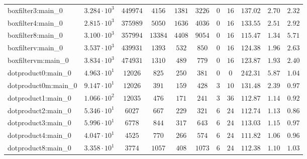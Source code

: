 \begin{tabular}{|l|c|c|c|c|c|c|c|c|c|c|}
boxfilter3:main\_0             & $ 3.284 \cdot 10^{3} $ & $ 449974   $ & $ 4156   $ & $ 1381   $ & $ 3226   $ & $ 0    $ & $ 16   $ & $ 137.02      $ & $ 2.70    $ & $ 2.32    $ \\
boxfilter4:main\_0             & $ 2.815 \cdot 10^{3} $ & $ 375989   $ & $ 5050   $ & $ 1636   $ & $ 4036   $ & $ 0    $ & $ 16   $ & $ 133.55      $ & $ 2.51    $ & $ 2.92    $ \\
boxfilter8:main\_0             & $ 3.100 \cdot 10^{3} $ & $ 357994   $ & $ 13384  $ & $ 4408   $ & $ 9054   $ & $ 0    $ & $ 16   $ & $ 115.47      $ & $ 1.34    $ & $ 5.71    $ \\
boxfilterv:main\_0             & $ 3.537 \cdot 10^{3} $ & $ 439931   $ & $ 1393   $ & $ 532    $ & $ 850    $ & $ 0    $ & $ 16   $ & $ 124.38      $ & $ 1.96    $ & $ 2.63    $ \\
boxfiltervm:main\_0            & $ 3.834 \cdot 10^{3} $ & $ 474931   $ & $ 1310   $ & $ 489    $ & $ 779    $ & $ 0    $ & $ 16   $ & $ 123.87      $ & $ 1.93    $ & $ 2.40    $ \\
dotproduct0:main\_0            & $ 4.963 \cdot 10^{1} $ & $ 12026    $ & $ 825    $ & $ 250    $ & $ 381    $ & $ 0    $ & $ 0    $ & $ 242.31      $ & $ 5.87    $ & $ 1.04    $ \\
dotproduct0m:main\_0           & $ 9.147 \cdot 10^{1} $ & $ 12026    $ & $ 391    $ & $ 159    $ & $ 428    $ & $ 3    $ & $ 10   $ & $ 131.48      $ & $ 2.39    $ & $ 0.97    $ \\
dotproduct1:main\_0            & $ 1.066 \cdot 10^{2} $ & $ 12035    $ & $ 476    $ & $ 171    $ & $ 241    $ & $ 3    $ & $ 36   $ & $ 112.87      $ & $ 1.14    $ & $ 0.92    $ \\
dotproduct2:main\_0            & $ 5.346 \cdot 10^{1} $ & $ 6027     $ & $ 667    $ & $ 229    $ & $ 321    $ & $ 6    $ & $ 24   $ & $ 112.74      $ & $ 1.13    $ & $ 0.86    $ \\
dotproduct3:main\_0            & $ 5.996 \cdot 10^{1} $ & $ 6778     $ & $ 844    $ & $ 317    $ & $ 643    $ & $ 6    $ & $ 24   $ & $ 113.03      $ & $ 1.15    $ & $ 0.97    $ \\
dotproduct4:main\_0            & $ 4.047 \cdot 10^{1} $ & $ 4525     $ & $ 770    $ & $ 266    $ & $ 574    $ & $ 6    $ & $ 24   $ & $ 111.82      $ & $ 1.06    $ & $ 0.96    $ \\
dotproduct8:main\_0            & $ 3.358 \cdot 10^{1} $ & $ 3774     $ & $ 1057   $ & $ 408    $ & $ 1073   $ & $ 6    $ & $ 24   $ & $ 112.38      $ & $ 1.10    $ & $ 1.03    $ \\

\end{tabular}

